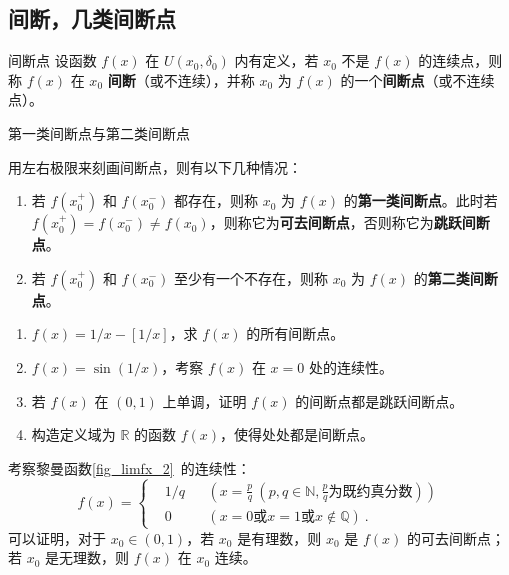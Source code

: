 \subsection{间断，几类间断点}
\begin{definition}{间断点}\label{def_confun_1}
  设函数 $f(x)$ 在 $U(x_0,\delta_0)$ 内有定义，若 $x_0$ 不是 $f(x)$ 的连续点，则称 $f(x)$ 在 $x_0$ \textbf{间断}（或不连续），并称 $x_0$ 为 $f(x)$ 的一个\textbf{间断点}（或不连续点）。
\end{definition}
\begin{definition}{第一类间断点与第二类间断点}

用左右极限来刻画间断点，则有以下几种情况：
\begin{enumerate}
\item 若 $f(x_0^+)$ 和 $f(x_0^-)$ 都存在，则称 $x_0$ 为 $f(x)$ 的\textbf{第一类间断点}。此时若 $f(x_0^+)=f(x_0^-)\neq f(x_0)$，则称它为\textbf{可去间断点}，否则称它为\textbf{跳跃间断点}。
\item 若 $f(x_0^+)$ 和 $f(x_0^-)$ 至少有一个不存在，则称 $x_0$ 为 $f(x)$ 的\textbf{第二类间断点}。
\end{enumerate}
\end{definition}

\begin{exercise}{}
\begin{enumerate}
\item $f(x)=1/x-[1/x]$，求 $f(x)$ 的所有间断点。
\item $f(x)=\sin(1/x)$，考察 $f(x)$ 在 $x=0$ 处的连续性。
\item 若 $f(x)$ 在 $(0,1)$ 上单调，证明 $f(x)$ 的间断点都是跳跃间断点。
\item 构造定义域为 $\mathbb{R}$ 的函数 $f(x)$，使得处处都是间断点。 
\end{enumerate}
\end{exercise}
  
考察黎曼函数\autoref{fig_limfx_2}~的连续性：
\begin{equation}
f(x)=\left\{
\begin{aligned}
&1/q && (x=\frac{p}{q}\ (p,q\in \mathbb{N}, \frac{p}{q}\text{为既约真分数}))\\
&0 && (x=0\text{或}x=1\text{或} x\notin \mathbb{Q})~.
\end{aligned} \right.
\end{equation}
可以证明，对于 $x_0\in(0,1)$，若 $x_0$ 是有理数，则 $x_0$ 是 $f(x)$ 的可去间断点；若 $x_0$ 是无理数，则 $f(x)$ 在 $x_0$ 连续。

